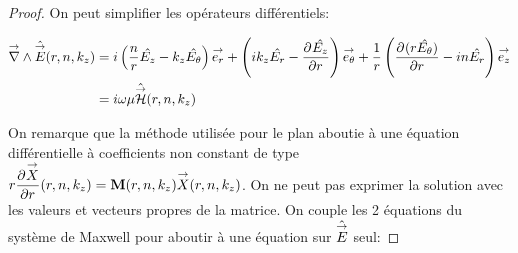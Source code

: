     \begin{proof}

        On peut simplifier les opérateurs différentiels:

        \begin{align}
            \vrot \hat \vE(r,n,k_z) &= i\left(\frac{n}{r}\hat{E_z} - k_z\hat{E_\theta}\right)\vect{e_r} + 
            \left(ik_z\hat{E_r} - \ddr{r}{\hat{E_z}}\right)\vect{e_\theta} +
            \frac{1}{r}\left(\ddr{r}{(r\hat{E_\theta})}-in\hat{E_r}\right)\vect{e_z}
            \\
            &=i\w\mu \hat \vH(r,n,k_z)
        \end{align}

        On remarque que la méthode utilisée pour le plan aboutie à une équation différentielle à coefficients non constant de type \(r\ddr{r}{\vect{X}}(r,n,k_z) = \mat{M}(r,n,k_z)\vect{X}(r,n,k_z)\).
        On ne peut pas exprimer la solution avec les valeurs et vecteurs propres de la matrice. 
        On couple  les 2 équations du système de Maxwell pour aboutir à une équation sur \(\hat \vE\) seul:




\end{proof}
